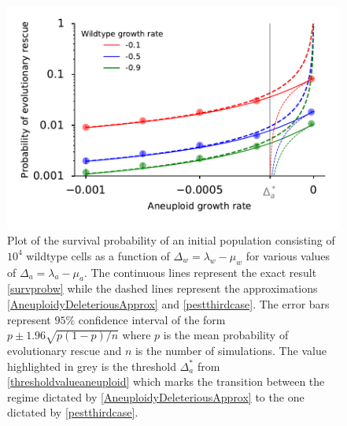 \documentclass[12pt]{extarticle}
\begin{document}
\begin{figure}[!t]
 \vspace*{1\baselineskip}
\includegraphics[width=1\textwidth]{Figures/P_est_divergence.pdf}
\caption{Plot of the survival probability of an initial population consisting of $10^{4}$ wildtype cells as a function of $\Delta_w=\lambda_w-\mu_w$ for various values of $\Delta_a=\lambda_a-\mu_a$. The continuous lines represent the exact result \eqref{survprobw} while the dashed lines represent the approximations \eqref{AneuploidyDeleteriousApprox} and \eqref{pestthirdcase}. The error bars represent $95\%$ confidence interval of the form $p\pm1.96\sqrt{p\left(1-p\right)/n}$ where $p$ is the mean probability of evolutionary rescue and $n$ is the number of simulations. The value highlighted in grey is the threshold $\Delta_a^*$ from \eqref{thresholdvalueaneuploid} which marks the transition between the regime dictated by \eqref{AneuploidyDeleteriousApprox} to the one dictated by \eqref{pestthirdcase}. }
\label{P_est}
\end{figure}
\end{document}
